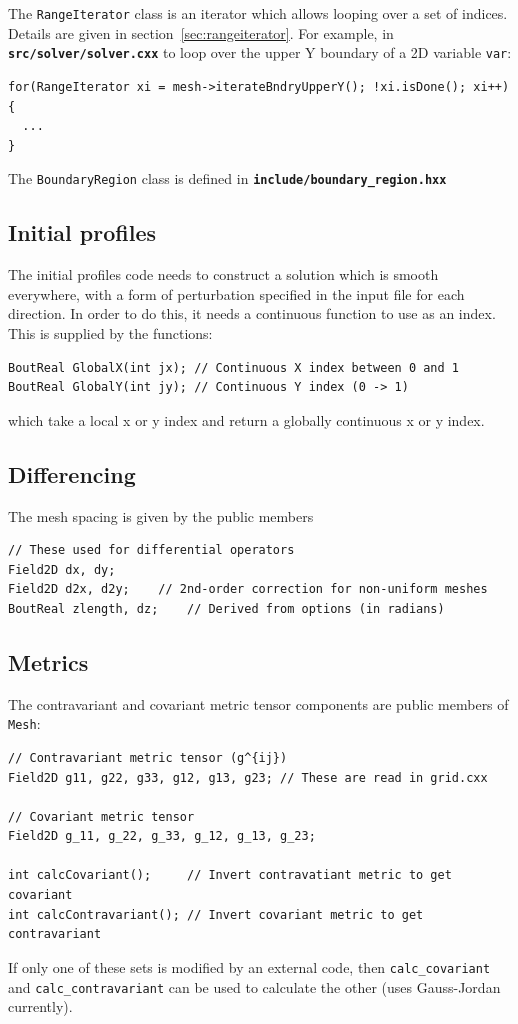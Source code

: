 \documentclass[12pt]{article}
\newcommand{\code}[1]{\texttt{#1}}
\newcommand{\file}[1]{\texttt{\bf #1}}
\begin{document}
The \code{RangeIterator} class is an iterator 
which allows looping over a set of indices. Details are given in
section~\ref{sec:rangeiterator}. For example, in
\file{src/solver/solver.cxx} to loop over the upper Y boundary of a 2D variable
\code{var}:
\begin{lstlisting}
for(RangeIterator xi = mesh->iterateBndryUpperY(); !xi.isDone(); xi++) {
  ...
}
\end{lstlisting}

The \lstinline!BoundaryRegion! class is defined in \file{include/boundary\_region.hxx}

\subsection{Initial profiles}
The initial profiles code needs to construct a solution which is smooth
everywhere, with a form of perturbation specified in the input file
for each direction. In order to do this, it needs a continuous function
to use as an index. This is supplied by the functions:
\begin{lstlisting}
BoutReal GlobalX(int jx); // Continuous X index between 0 and 1
BoutReal GlobalY(int jy); // Continuous Y index (0 -> 1)
\end{lstlisting}
which take a local x or y index and return a globally continuous x or y
index.

\subsection{Differencing}

The mesh spacing is given by the public members
\begin{lstlisting}
// These used for differential operators 
Field2D dx, dy;
Field2D d2x, d2y;    // 2nd-order correction for non-uniform meshes		
BoutReal zlength, dz;    // Derived from options (in radians)
\end{lstlisting}

\subsection{Metrics}
The contravariant and covariant metric tensor components are
public members of \code{Mesh}: 
\begin{lstlisting}
// Contravariant metric tensor (g^{ij})
Field2D g11, g22, g33, g12, g13, g23; // These are read in grid.cxx

// Covariant metric tensor
Field2D g_11, g_22, g_33, g_12, g_13, g_23;

int calcCovariant();     // Invert contravatiant metric to get covariant
int calcContravariant(); // Invert covariant metric to get contravariant
\end{lstlisting}
If only one of these sets is modified by an external code, then
\code{calc\_covariant} and \code{calc\_contravariant} can be used
to calculate the other (uses Gauss-Jordan currently).
\end{document}
